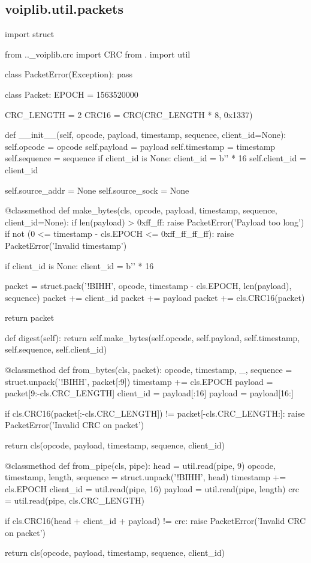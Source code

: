 \subsection{voiplib.util.packets}
\begin{pythoncode}
import struct

from .._voiplib.crc import CRC
from . import util


class PacketError(Exception):
    pass


class Packet:
    EPOCH = 1563520000

    CRC_LENGTH = 2
    CRC16 = CRC(CRC_LENGTH * 8, 0x1337)

    def __init__(self, opcode, payload, timestamp, sequence, client_id=None):
        self.opcode = opcode
        self.payload = payload
        self.timestamp = timestamp
        self.sequence = sequence
        if client_id is None:
            client_id = b'\0' * 16
        self.client_id = client_id

        self.source_addr = None
        self.source_sock = None

    @classmethod
    def make_bytes(cls, opcode, payload, timestamp, sequence, client_id=None):
        if len(payload) > 0xff_ff:
            raise PacketError('Payload too long')
        if not (0 <= timestamp - cls.EPOCH <= 0xff_ff_ff_ff):
            raise PacketError('Invalid timestamp')

        if client_id is None:
            client_id = b'\0' * 16

        packet = struct.pack('!BIHH', opcode, timestamp - cls.EPOCH, len(payload), sequence)
        packet += client_id
        packet += payload
        packet += cls.CRC16(packet)

        return packet

    def digest(self):
        return self.make_bytes(self.opcode, self.payload, self.timestamp, self.sequence, self.client_id)

    @classmethod
    def from_bytes(cls, packet):
        opcode, timestamp, _, sequence = struct.unpack('!BIHH', packet[:9])
        timestamp += cls.EPOCH
        payload = packet[9:-cls.CRC_LENGTH]
        client_id = payload[:16]
        payload = payload[16:]

        if cls.CRC16(packet[:-cls.CRC_LENGTH]) != packet[-cls.CRC_LENGTH:]:
            raise PacketError('Invalid CRC on packet')

        return cls(opcode, payload, timestamp, sequence, client_id)

    @classmethod
    def from_pipe(cls, pipe):
        head = util.read(pipe, 9)
        opcode, timestamp, length, sequence = struct.unpack('!BIHH', head)
        timestamp += cls.EPOCH
        client_id = util.read(pipe, 16)
        payload = util.read(pipe, length)
        crc = util.read(pipe, cls.CRC_LENGTH)

        if cls.CRC16(head + client_id + payload) != crc:
            raise PacketError('Invalid CRC on packet')

        return cls(opcode, payload, timestamp, sequence, client_id)
\end{pythoncode}
